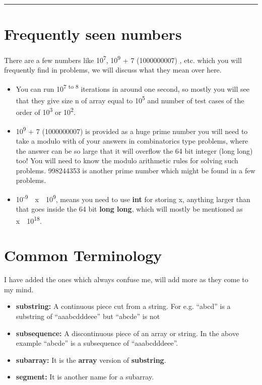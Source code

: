 \documentclass[13pt,oneside,a4paper]{book}
\begin{document}
\hrule\bigskip

\section{Frequently seen numbers}

There are a few numbers like 10\textsuperscript{7}, 10\textsuperscript{9} + 7 (1000000007) , etc. which you
will frequently find in problems, we will discuss what they mean over here.

\begin{itemize}
        \item You can run 10\textsuperscript{7 to 8} iterations in around one second, so
                mostly you will see that they give size n of array equal to 10\textsuperscript{5} 
                and number of test cases of the order of 10\textsuperscript{3} or 10\textsuperscript{2}.
        \item 10\textsuperscript{9} + 7 (1000000007) is provided as a huge prime number you will need
                to take a modulo with of your answers in combinatorics type problems, where the answer can be so large
                that it will overflow the 64 bit integer (long long) too! You will need to know the modulo
                arithmetic rules for solving such problems. 998244353 is another prime number which might be
                found in a few problems.
        \item 10\textsuperscript{-9}~\leq~x~\leq~10\textsuperscript{9}, means you need to use \textbf{int} for storing x, anything
                larger than that goes inside the 64 bit \textbf{long long}, which will mostly be mentioned as x~\leq~10\textsuperscript{18}.
\end{itemize}

\section{Common Terminology}

I have added the ones which always confuse me, will add more as
they come to my mind.

\begin{itemize}
        \item \textbf{substring:} A continuous piece cut from a string. For e.g. ``abcd'' is a substring of ``aaabcdddeee'' but ``abcde'' is not
        \item \textbf{subsequence:} A discontinuous piece of an array or string. In the above example ``abcde'' is a subsequence of ``aaabcdddeee''.
        \item \textbf{subarray:} It is the \textbf{array} version of \textbf{substring}.
        \item \textbf{segment:} It is another name for a subarray.
\end{itemize}
\end{document}
